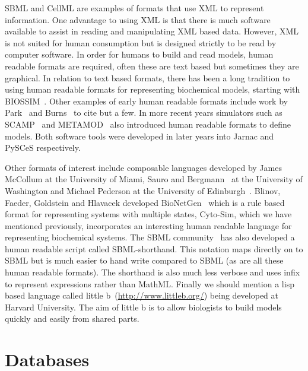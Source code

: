 \documentclass[12pt]{article}
\begin{document}
SBML and CellML are examples of formats that use XML to represent
information. One advantage to using XML is that there is much
software available to assist in reading and manipulating XML based
data. However, XML is not suited for human consumption but is
designed strictly to be read by computer software. In order for
humans to build and read models, human readable formats are
required, often these are text based but sometimes they are graphical. In relation to text based formats, there has been a long tradition to using human readable formats for representing
biochemical models, starting with BIOSSIM~\citep{Garfinkel:1970}.
Other examples of early human readable formats include work by
Park~\citep{PW73} and Burns~\citep{Bu71} to cite but a few. In more
recent years simulators such as SCAMP~\citep{SauroF91} and
METAMOD~\citep{HM86}  also introduced human readable formats to
define models. Both software tools were developed in later years into Jarnac and PySCeS respectively.

Other formats of interest include composable languages developed by
James McCollum at the University of Miami, Sauro and
Bergmann~\citep{BergmannShortHand} at the University of Washington
and Michael Pederson at the University of
Edinburgh~\citep{Pederson:LBS:2008}. Blinov, Faeder, Goldstein and
Hlavacek developed BioNetGen~\citep{Blinov:2004} which is a rule
based format for representing systems with multiple states,
Cyto-Sim, which we have mentioned previously, incorporates an
interesting human readable language for representing biochemical
systems. The SBML community~\citep{SBMLShortHand} has also developed
a human readable script called SBML-shorthand. This notation maps
directly on to SBML but is much easier to hand write compared to
SBML (as are all these human readable formats). The shorthand is
also much less verbose and uses infix to represent expressions
rather than MathML. Finally we should mention a lisp based language
called little b~(\url{http://www.littleb.org/}) being developed at
Harvard University. The aim of little b is to allow biologists to
build models quickly and easily from shared parts.

\section{Databases}
\end{document}
